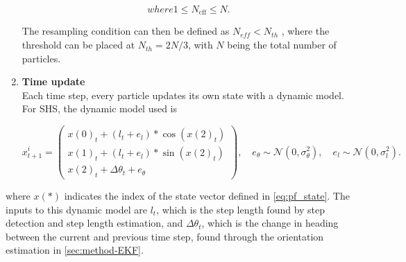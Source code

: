 \begin{enumerate}
\begin{subequations}
		where
		
		\begin{equation}
		1 \leq N_{\mathrm{cff}} \leq N.
		\end{equation}
	\end{subequations}
	
	The resampling condition can then be defined as $N_{eff} < N_{th}$ \cite{gustafsson2010statistical}, where the threshold can be placed at $N_{th} = 2N/3$, with $N$ being the total number of particles.
	
	
	\item \textbf{Time update} \\	
	Each time step, every particle updates its own state with a dynamic model. For SHS, the dynamic model used is
	
	\begin{equation}
	\label{eq:SHS_dynamic_model_with_noise}
	x^i_{t + 1}
	=
	\left(\begin{array}{l}
	x(0)_{t} + (l_{t} + e_l) * \cos (x(2)_{t}) \\
	x(1)_{t} + (l_{t} + e_l) * \sin (x(2)_{t}) \\
	x(2)_{t} + \Delta \theta_t + e_\theta 
	\end{array}\right), \quad
	e_{\theta} \sim \mathcal{N}\left(0, \sigma_{\theta}^{2}\right), \quad e_{l} \sim \mathcal{N}\left(0, \sigma_{l}^{2}\right).
	\end{equation}
\end{enumerate}

where $x(*)$ indicates the index of the state vector defined in \eqref{eq:pf_state}. The inputs to this dynamic model are $l_{t}$, which is the step length found by step detection and step length estimation, and $\Delta \theta_t$, which is the change in heading between the current and previous time step, found through the orientation estimation in \cref{sec:method-EKF}.

